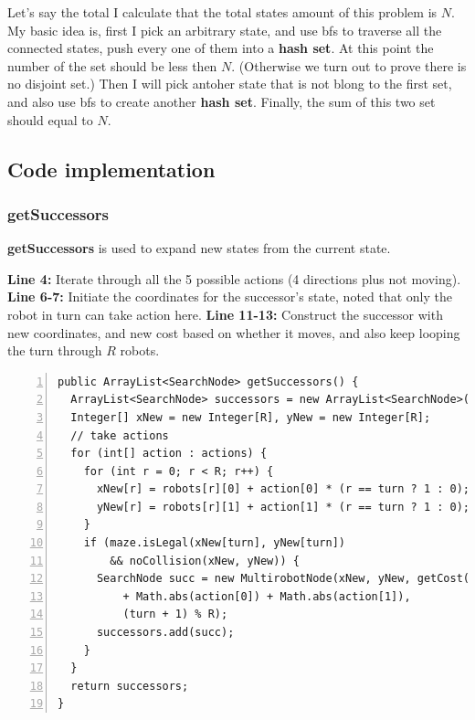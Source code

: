\documentclass{article}
\begin{document}
Let's say the total I calculate that the total states amount of this problem is $N$. My basic idea is, first I pick an arbitrary state, and use bfs to traverse all the connected states, push every one of them into a \textbf{hash set}. At this point the number of the set should be less then $N$. (Otherwise we turn out to prove there is no disjoint set.) Then I will pick antoher state that is not blong to the first set, and also use bfs to create another \textbf{hash set}. Finally, the sum of this two set should equal to $N$.



















\subsection{Code implementation}


\subsubsection{getSuccessors}

\textbf{getSuccessors} is used to expand new states from the current state.

\textbf{Line 4:} Iterate through all the 5 possible actions (4 directions plus not moving).
\textbf{Line 6-7:} Initiate the coordinates for the successor's state, noted that only the robot in turn can take action here.
\textbf{Line 11-13:} Construct the successor with new coordinates, and new cost based on whether it moves, and also keep looping the turn through $R$ robots.

\begin{lstlisting}[numbers=left]
public ArrayList<SearchNode> getSuccessors() {
  ArrayList<SearchNode> successors = new ArrayList<SearchNode>();
  Integer[] xNew = new Integer[R], yNew = new Integer[R];
  // take actions
  for (int[] action : actions) {
    for (int r = 0; r < R; r++) {
      xNew[r] = robots[r][0] + action[0] * (r == turn ? 1 : 0);
      yNew[r] = robots[r][1] + action[1] * (r == turn ? 1 : 0);
    }
    if (maze.isLegal(xNew[turn], yNew[turn])
        && noCollision(xNew, yNew)) {
      SearchNode succ = new MultirobotNode(xNew, yNew, getCost()
          + Math.abs(action[0]) + Math.abs(action[1]),
          (turn + 1) % R);
      successors.add(succ);
    }
  }
  return successors;
}
\end{lstlisting}
\end{document}
